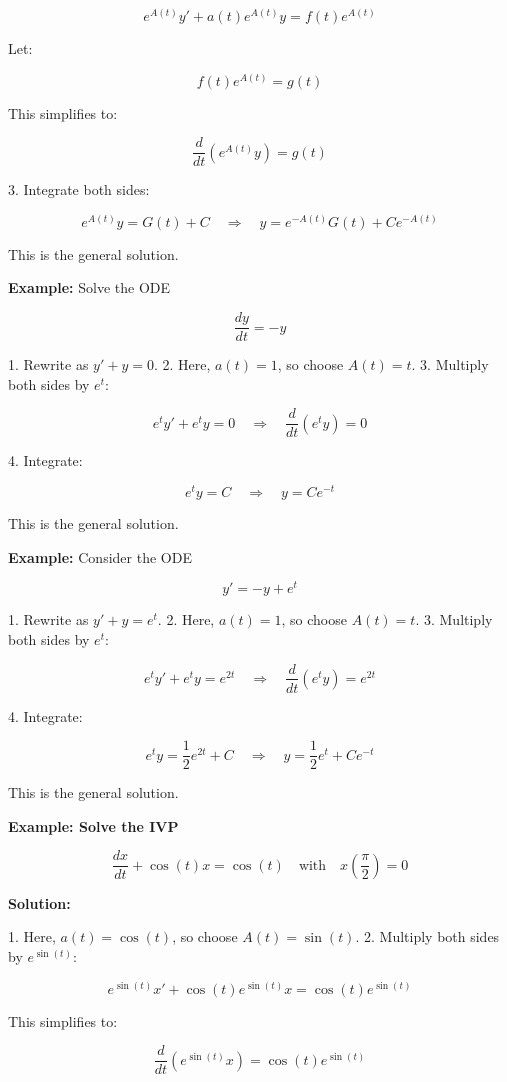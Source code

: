 \documentclass{article}
\begin{document}
\[
e^{A(t)} y' + a(t) e^{A(t)} y = f(t) e^{A(t)}
\]

Let:

\[
f(t) e^{A(t)} = g(t)
\]

This simplifies to:

\[
\frac{d}{dt} \left( e^{A(t)} y \right) = g(t)
\]

3. Integrate both sides:

\[
e^{A(t)} y = G(t) + C \quad \Rightarrow \quad y = e^{-A(t)} G(t) + C e^{-A(t)}
\]

This is the general solution.

\textbf{Example:} Solve the ODE

\[
\frac{dy}{dt} = -y
\]

1. Rewrite as \( y' + y = 0 \).
2. Here, \( a(t) = 1 \), so choose \( A(t) = t \).
3. Multiply both sides by \( e^t \):

\[
e^t y' + e^t y = 0 \quad \Rightarrow \quad \frac{d}{dt} (e^t y) = 0
\]

4. Integrate:

\[
e^t y = C \quad \Rightarrow \quad y = C e^{-t}
\]

This is the general solution.

\textbf{Example:} Consider the ODE

\[
y' = -y + e^t
\]

1. Rewrite as \( y' + y = e^t \).
2. Here, \( a(t) = 1 \), so choose \( A(t) = t \).
3. Multiply both sides by \( e^t \):

\[
e^t y' + e^t y = e^{2t} \quad \Rightarrow \quad \frac{d}{dt} (e^t y) = e^{2t}
\]

4. Integrate:

\[
e^t y = \frac{1}{2} e^{2t} + C \quad \Rightarrow \quad y = \frac{1}{2} e^t + C e^{-t}
\]

This is the general solution.

\textbf{Example: Solve the IVP}

\[
\frac{dx}{dt} + \cos(t)x = \cos(t) \quad \text{with} \quad x\left(\frac{\pi}{2}\right) = 0
\]

\textbf{Solution:}

1. Here, \( a(t) = \cos(t) \), so choose \( A(t) = \sin(t) \).
2. Multiply both sides by \( e^{\sin(t)} \):

\[
e^{\sin(t)} x' + \cos(t) e^{\sin(t)} x = \cos(t) e^{\sin(t)}
\]

This simplifies to:

\[
\frac{d}{dt} \left( e^{\sin(t)} x \right) = \cos(t) e^{\sin(t)}
\]
\end{document}

